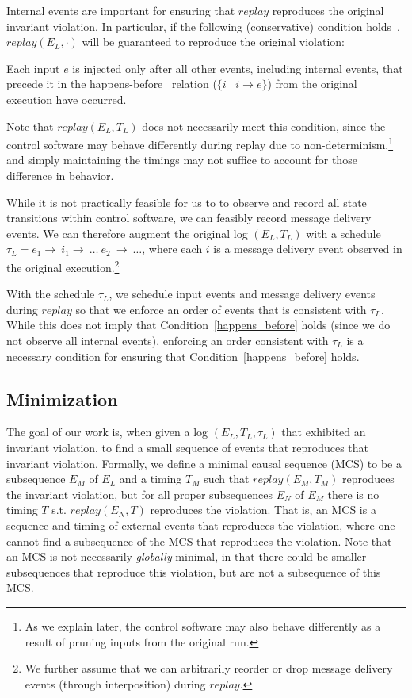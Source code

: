 Internal events are important for ensuring that $replay$ reproduces the
original invariant violation. In particular, if the following (conservative) condition holds~\cite{tel2000introduction}, $replay(E_L, \cdot)$ will be
guaranteed to reproduce the original violation:

\begin{condition}
\label{happens_before}
Each input $e$ is injected only after all other events, including internal events, that precede it in the
happens-before~\cite{Lamport:1978:TCO:359545.359563} relation ($\{i \mid i \rightarrow e\}$) from the
original execution have occurred.
\end{condition}

\noindent Note that $replay(E_L, T_L)$ does not necessarily meet this condition, since the control software may behave
differently during replay due to non-determinism,\footnote{As we explain
later, the control software may also behave differently as a result of
pruning inputs from the original run.} and simply maintaining the timings may not suffice
to account for those difference in behavior.

While it is not practically feasible for us to to observe and record all state
transitions within control software, we can feasibly record message delivery
events. We can therefore augment the original log $(E_L, T_L)$ with a schedule
$\tau_L = e_1\rightarrow~i_1\rightarrow~\dots~e_2~\rightarrow~\dots$, where
each $i$ is a message delivery event observed in the original
execution.\footnote{We further assume that we can arbitrarily reorder or
drop message delivery events (through interposition) during $replay$.}

With the schedule $\tau_L$, we schedule input events and message delivery
events during $replay$ so that we enforce an order
of events that is consistent with $\tau_L$. While this does not imply that
Condition~\ref{happens_before} holds (since we do not observe all internal
events), enforcing an order consistent with
$\tau_L$ is a necessary condition for ensuring that
Condition~\ref{happens_before} holds.

\subsection{Minimization}

The goal of our work is, when given a log $(E_L, T_L, \tau_L)$ that exhibited an
invariant violation, to find a small sequence of events that reproduces that
invariant violation. Formally, we define a minimal causal sequence (MCS)
to be a subsequence $E_M$
of $E_L$ and a timing $T_M$ such
that $replay(E_M,T_M)$ reproduces the invariant violation, but for all proper
subsequences $E_N$ of $E_M$
there is no timing $T$ s.t. $replay(E_N,T)$ reproduces the violation.
That is, an MCS is a sequence and timing of external events that reproduces the violation,
where one cannot find a subsequence of the MCS that reproduces the violation.
Note that an MCS is not necessarily {\em globally} minimal, in that there could be smaller
subsequences that reproduce this violation, but are not a subsequence of this MCS.

